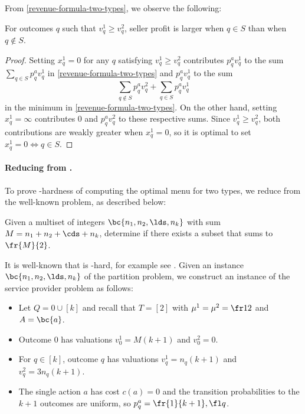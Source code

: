 From \cref{revenue-formula-two-types}, we observe the following:

\begin{claim*} \label{q-in-s}
     For outcomes $q$ such that $v^1_q \ge v^2_q$, seller profit is larger when $q \in S$ than when $q\notin S$.
\end{claim*}

\begin{proof}
    Setting $x^1_q = 0$ for any $q$ satisfying $v^1_q \ge v^2_q$ contributes $p^a_q v^1_q$ to the sum $\sum_{q \in S} p_q^a v_q^1$ in \cref{revenue-formula-two-types} and $p^a_q v_q^1$ to the sum $$\sum_{q\notin S} p^a_q v^2_q + \sum_{q\in S} p^a_q v^1_q$$ in the minimum in \cref{revenue-formula-two-types}. On the other hand, setting $x^1_q = \infty$ contributes 0 and $p^a_q v^2_q$ to these respective sums. Since $v^1_q \ge v^2_q$, both contributions are weakly greater when $x^1_q = 0$, so it is optimal to set $x^1_q = 0\iff q\in S$.
\end{proof}

\paragraph{Reducing from .}

To prove -hardness of computing the optimal menu for two types, we reduce from the well-known  problem, as described below:
\begin{problem*}
    Given a multiset of integers $\bc{n_1,n_2,\lds, n_k}$ with sum $M = n_1 + n_2 + \cds + n_k$, determine if there exists a subset that sums to $\fr{M}{2}$.
\end{problem*}

It is well-known that  is -hard, for example see \citet{hayes2002easiest}. Given an instance $\bc{n_1,n_2,\lds,n_k}$ of the partition problem, we construct an instance of the service provider problem as follows:
\begin{itemize}
    \item Let $Q = 0\cup [k]$ and recall that $T = [2]$ with $\mu^1 = \mu^2 = \fr12$ and $A = \bc{a}$.
    \item Outcome $0$ has valuations $v^1_0 = M(k+1)$ and $v^2_0 = 0$.
    \item For $q\in [k]$, outcome $q$ has valuations $v^1_q = n_q(k+1)$ and $v^2_q = 3n_q(k+1)$.
    \item The single action $a$ has cost $c(a) = 0$ and the transition probabilities to the $k+1$ outcomes are uniform, so $p^a_q = \fr{1}{k+1},\fl q$.
\end{itemize}

